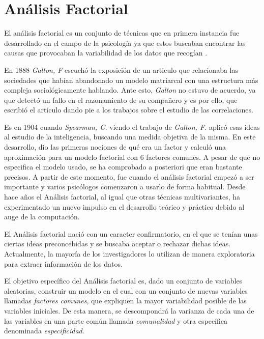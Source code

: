 \newpage
\section{Análisis Factorial}
\noindent El análisis factorial es un conjunto de técnicas que en primera instancia fue desarrollado en el campo de la psicología ya que estos buscaban encontrar las causas que provocaban la variabilidad de los datos que recogían \cite{Vincent 1953}. 

\noindent En 1888 \emph{Galton, F} escuchó la exposición de un articulo que relacionaba las sociedades que habían abandonado un modelo matriarcal con una estructura más compleja sociológicamente hablando. Ante esto, \emph{Galton} no estuvo de acuerdo, ya que detectó un fallo en el razonamiento de su compañero y es por ello, que escribió el artículo \cite{Galton 1889} dando pie a los trabajos sobre el estudio de las correlaciones.   

\noindent Es en 1904 cuando \emph{Spearman, C.} \cite{Spearman 1904} viendo el trabajo de \emph{Galton, F.} aplicó esas ideas al estudio de la inteligencia, buscando una medida objetiva de la misma. En este desarrollo, dio las primeras nociones de qué era un factor y calculó una aproximación para un modelo factorial con 6 factores comunes. A pesar de que no especifica el modelo usado, se ha comprobado a posteriori  que eran bastante precisos. A partir de este momento, fue cuando el análisis factorial empezó a ser importante y varios psicólogos comenzaron a usarlo de forma habitual. 
Desde hace años el Análisis factorial, al igual que otras técnicas multivariantes, ha experimentado un nuevo impulso en el desarrollo teórico y práctico debido al auge de la computación. 

\noindent El Análisis factorial nació con un caracter confirmatorio, en el que se tenían unas ciertas ideas preconcebidas y se buscaba aceptar o rechazar dichas ideas. Actualmente, la mayoría de los investigadores lo utilizan de manera exploratoria para extraer información de los datos.\cite{Hair 1995}

\noindent El objetivo específico del Análisis factorial es, dado un conjunto de variables aleatorias, construir un modelo en el cual con un conjunto de nuevas variables llamadas \emph{factores comunes}, que expliquen la mayor variabilidad posible de las variables iniciales. De esta manera, se descompondrá la varianza de cada una de las variables en una parte común llamada \emph{comunalidad}  y otra específica denominada \emph{especificidad}. 

